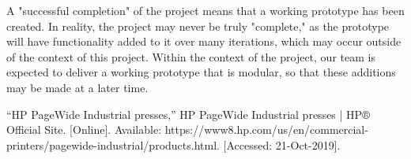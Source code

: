 \documentclass[draftclsnofoot,onecolumn,10pt]{IEEEtran}
\begin{document}
A "successful completion" of the project means that a working prototype has been created. In reality, the project may never be truly "complete," as the prototype will have functionality added to it over many iterations, which may occur outside of the context of this project. Within the context of the project, our team is expected to deliver a working prototype that is modular, so that these additions may be made at a later time.

\bigskip
\begin{thebibliography}{1}
“HP PageWide Industrial presses,” HP PageWide Industrial presses | HP® Official Site. [Online]. Available: https://www8.hp.com/us/en/commercial-printers/pagewide-industrial/products.html. [Accessed: 21-Oct-2019].
\end{thebibliography}
\end{document}
